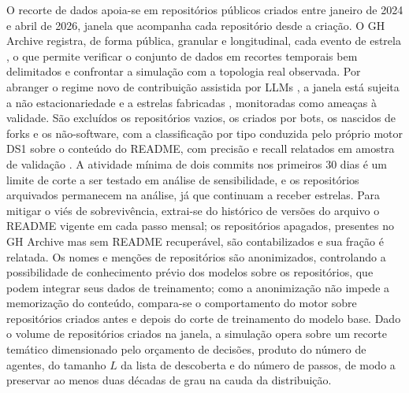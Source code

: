 \documentclass[12pt,oneside,a4paper,brazil,sumario=tradicional]{abntex2}
\begin{document}
O recorte de dados apoia-se em repositórios públicos criados entre janeiro de 2024 e abril de 2026, janela que acompanha cada repositório desde a criação. O GH Archive registra, de forma pública, granular e longitudinal, cada evento de estrela \parencite{grigorik_gharchive}, o que permite verificar o conjunto de dados em recortes temporais bem delimitados e confrontar a simulação com a topologia real observada. Por abranger o regime novo de contribuição assistida por LLMs \parencite{gu2026, popescu2026, taillandier2026}, a janela está sujeita a não estacionariedade e a estrelas fabricadas \parencite{he2025b}, monitoradas como ameaças à validade. São excluídos os repositórios vazios, os criados por bots, os nascidos de forks e os não-software, com a classificação por tipo conduzida pelo próprio motor DS1 sobre o conteúdo do README, com precisão e recall relatados em amostra de validação \parencite{jiang2017, he2025b}. A atividade mínima de dois commits nos primeiros 30 dias é um limite de corte a ser testado em análise de sensibilidade, e os repositórios arquivados permanecem na análise, já que continuam a receber estrelas. Para mitigar o viés de sobrevivência, extrai-se do histórico de versões do arquivo o README vigente em cada passo mensal; os repositórios apagados, presentes no GH Archive mas sem README recuperável, são contabilizados e sua fração é relatada. Os nomes e menções de repositórios são anonimizados, controlando a possibilidade de conhecimento prévio dos modelos sobre os repositórios, que podem integrar seus dados de treinamento; como a anonimização não impede a memorização do conteúdo, compara-se o comportamento do motor sobre repositórios criados antes e depois do corte de treinamento do modelo base. Dado o volume de repositórios criados na janela, a simulação opera sobre um recorte temático dimensionado pelo orçamento de decisões, produto do número de agentes, do tamanho $L$ da lista de descoberta e do número de passos, de modo a preservar ao menos duas décadas de grau na cauda da distribuição.
\end{document}

